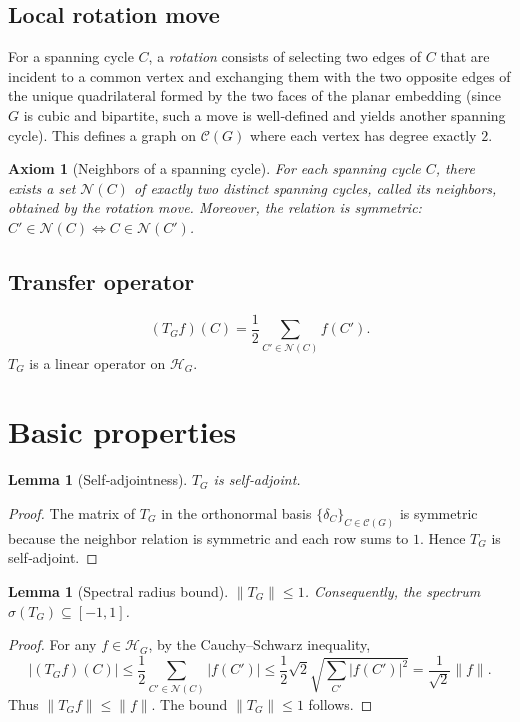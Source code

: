 \documentclass[11pt,a4paper]{article}
\newtheorem{lemma}[theorem]{Lemma}
\newtheorem{axiom}{Axiom}[section]
\begin{document}
\subsection{Local rotation move}
For a spanning cycle \(C\), a \emph{rotation} consists of selecting two edges of \(C\) that are incident to a common vertex and exchanging them with the two opposite edges of the unique quadrilateral formed by the two faces of the planar embedding (since \(G\) is cubic and bipartite, such a move is well‑defined and yields another spanning cycle). This defines a graph on \(\mathcal{C}(G)\) where each vertex has degree exactly \(2\).

\begin{axiom}[Neighbors of a spanning cycle]
For each spanning cycle \(C\), there exists a set \(\mathcal{N}(C)\) of exactly two distinct spanning cycles, called its neighbors, obtained by the rotation move. Moreover, the relation is symmetric: \(C' \in \mathcal{N}(C) \iff C \in \mathcal{N}(C')\).
\end{axiom}

\subsection{Transfer operator}
\[
(T_G f)(C) = \frac{1}{2} \sum_{C' \in \mathcal{N}(C)} f(C').
\]
\(T_G\) is a linear operator on \(\mathcal{H}_G\).

\section{Basic properties}

\begin{lemma}[Self‑adjointness]
\(T_G\) is self‑adjoint.
\end{lemma}
\begin{proof}
The matrix of \(T_G\) in the orthonormal basis \(\{\delta_C\}_{C\in\mathcal{C}(G)}\) is symmetric because the neighbor relation is symmetric and each row sums to \(1\). Hence \(T_G\) is self‑adjoint.
\end{proof}

\begin{lemma}[Spectral radius bound]
\(\|T_G\| \le 1\). Consequently, the spectrum \(\sigma(T_G) \subseteq [-1,1]\).
\end{lemma}
\begin{proof}
For any \(f\in\mathcal{H}_G\), by the Cauchy–Schwarz inequality,
\[
|(T_G f)(C)| \le \frac{1}{2}\sum_{C'\in\mathcal{N}(C)} |f(C')| \le \frac{1}{2}\sqrt{2}\sqrt{\sum_{C'}|f(C')|^2} = \frac{1}{\sqrt{2}}\|f\|.
\]
Thus \(\|T_G f\| \le \|f\|\). The bound \(\|T_G\|\le 1\) follows.
\end{proof}
\end{document}

